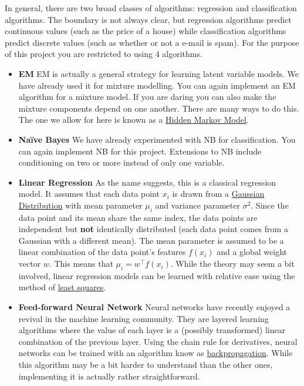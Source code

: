 \documentclass[11pt, leqno, a4paper]{article}
\begin{document}
In general, there are two broad classes of algorithms: regression and classification algorithms. The boundary is not always clear, but regression algorithms predict
continuous values (such as the price of a house) while classification algorithms predict discrete values (such as whether or not a e-mail is spam). For the purpose
of this project you are restricted to using 4 algorithms.
\begin{itemize}
\item \textbf{EM} EM is actually a general strategy for learning latent variable models. We have already used it for mixture modelling. You can again implement
an EM algorithm for a mixture model. If you are daring you can also make the mixture components depend on one another. There are many ways to do this. The one we 
allow for here is known as a 
\href{https://en.wikipedia.org/wiki/Hidden_Markov_model}{Hidden Markov Model}.
\item \textbf{Na\"ive Bayes} We have already experimented with NB for classification. You can again implement NB for this project. Extensions to NB include conditioning
on two or more instead of only one variable.
\item \textbf{Linear Regression} As the name suggests, this is a classical regression model. It assumes that each data point $ x_{i} $ is drawn from a 
\href{https://en.wikipedia.org/wiki/Normal_distribution}{Gaussian Distribution} with mean parameter $ \mu_{i} $ and variance parameter $ \sigma^{2} $. Since the data
point and its mean share the same index, the data points are independent but \textbf{not} identically distributed (each data point comes from a Gaussian with a 
different mean). The mean parameter is assumed to be a linear combination of the data point's features $ f(x_{i}) $ and a global weight vector $ w $. This means
that $ \mu_{i} = w^{\top}f(x_{i}) $. While the theory may seem a bit involved, linear regression models can be learned with relative ease using the method of 
\href{https://en.wikipedia.org/wiki/Least_squares}{least squares}.
\item \textbf{Feed-forward Neural Network} Neural networks have recently enjoyed a revival in the machine learning community. They are layered learning algorithms
where the value of each layer is a (possibly transformed) linear combination of the previous layer. Using the chain rule for derivatives, neural networks can
be trained with an algorithm know as \href{http://www.nature.com/nature/journal/v323/n6088/pdf/323533a0.pdf}{backpropagation}. While this algorithm may be a bit
harder to understand than the other ones, implementing it is actually rather straightforward. 
\end{itemize}
\end{document}
